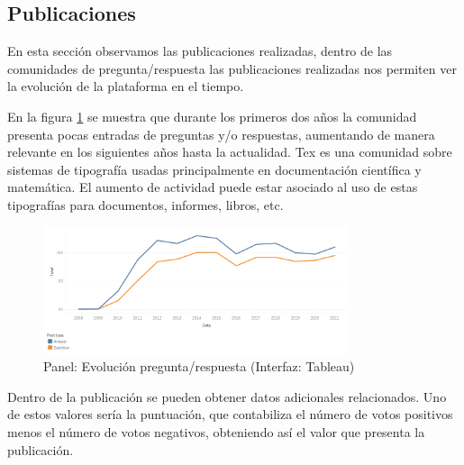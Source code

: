 \documentclass[a4paper, 12pt]{book}
\begin{document}
\clearpage


\subsection{Publicaciones}

En esta sección observamos las publicaciones realizadas, dentro de las comunidades de pregunta/respuesta las publicaciones realizadas nos permiten ver la evolución de la plataforma en el tiempo. 

En la figura \ref{figura:evo_post_anual_tex} se muestra que durante los primeros dos años la comunidad presenta pocas entradas de preguntas y/o respuestas, aumentando de manera relevante en los siguientes años hasta la actualidad. Tex es una comunidad sobre sistemas de tipografía usadas principalmente en documentación científica y matemática. El aumento de actividad puede estar asociado al uso de estas tipografías para documentos, informes, libros, etc. 

\begin{figure}[ht]
   \centering
    \includegraphics[width=0.8\textwidth]{img/tex/evo_posts_anual_tex.png}
    \caption{Panel: Evolución pregunta/respuesta (Interfaz: Tableau)}
    \label{figura:evo_post_anual_tex}
\end{figure}

Dentro de la publicación se pueden obtener datos adicionales relacionados. Uno de estos valores sería la puntuación, que contabiliza el número de votos positivos menos el número de votos negativos, obteniendo así el valor que presenta la publicación. 
\end{document}
